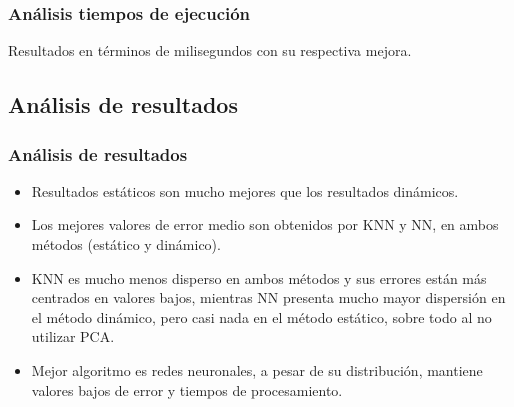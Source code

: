 \documentclass[handout]{beamer}
\begin{document}
\begin{frame}
\frametitle{Análisis tiempos de ejecución}

Resultados en términos de milisegundos con su respectiva mejora.

\begin{table}[ht!]
\centering
{}
\end{table}

\end{frame}

\subsection{Análisis de resultados}
\begin{frame}
\frametitle{Análisis de resultados}

\begin{itemize}

\item Resultados estáticos son mucho mejores que los resultados dinámicos.
\pause

\item Los mejores valores de error medio son obtenidos por KNN y NN, en ambos métodos (estático y dinámico).
\pause

\item KNN es mucho menos disperso en ambos métodos y sus errores están más centrados en valores bajos, mientras NN presenta mucho mayor dispersión en el método dinámico, pero casi nada en el método estático, sobre todo al no utilizar PCA.
\pause

\item Mejor algoritmo es redes neuronales, a pesar de su distribución, mantiene valores bajos de error y tiempos de procesamiento.

\end{itemize}

\end{frame}
\end{document}
